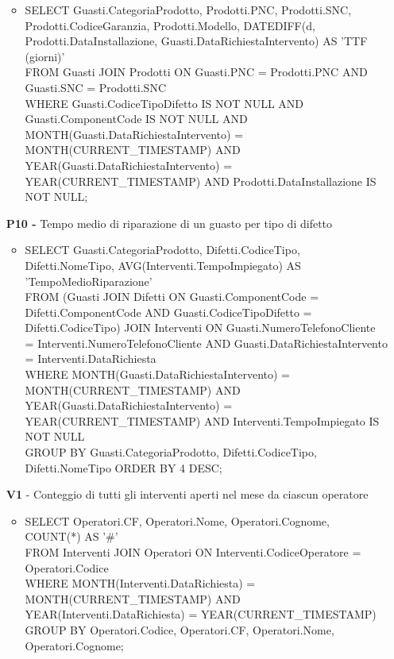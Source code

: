 \documentclass[a4paper, 12pt]{report}
\begin{document}
\begin{itemize}
\begin{itemize}[leftmargin=*, topsep=0pt]
			\item SELECT Guasti.CategoriaProdotto, Prodotti.PNC, Prodotti.SNC, Prodotti.CodiceGaranzia, Prodotti.Modello, DATEDIFF(d, Prodotti.DataInstallazione, Guasti.DataRichiestaIntervento) AS 'TTF (giorni)'\\
			FROM Guasti JOIN Prodotti ON Guasti.PNC = Prodotti.PNC AND Guasti.SNC = Prodotti.SNC\\
			WHERE Guasti.CodiceTipoDifetto IS NOT NULL AND Guasti.ComponentCode IS NOT NULL AND MONTH(Guasti.DataRichiestaIntervento) = \\MONTH(CURRENT\_TIMESTAMP) AND YEAR(Guasti.DataRichiestaIntervento) = YEAR(CURRENT\_TIMESTAMP) AND Prodotti.DataInstallazione IS NOT NULL;
		\end{itemize}
	\newpage
	\item[\textbf{P10 -}] Tempo medio di riparazione di un guasto per tipo di difetto
		\begin{itemize}[leftmargin=*, topsep=0pt]
			\item SELECT Guasti.CategoriaProdotto, Difetti.CodiceTipo, Difetti.NomeTipo, AVG(Interventi.TempoImpiegato) AS 'TempoMedioRiparazione'\\
			FROM (Guasti JOIN Difetti ON Guasti.ComponentCode = Difetti.ComponentCode AND Guasti.CodiceTipoDifetto = Difetti.CodiceTipo) JOIN Interventi ON Guasti.NumeroTelefonoCliente = Interventi.NumeroTelefonoCliente AND Guasti.DataRichiestaIntervento = Interventi.DataRichiesta\\
			WHERE MONTH(Guasti.DataRichiestaIntervento) = MONTH(CURRENT\_TIMESTAMP) AND YEAR(Guasti.DataRichiestaIntervento) = YEAR(CURRENT\_TIMESTAMP) AND Interventi.TempoImpiegato IS NOT NULL\\
			GROUP BY Guasti.CategoriaProdotto, Difetti.CodiceTipo, Difetti.NomeTipo ORDER BY 4 DESC;
		\end{itemize}
	\item[\textbf{V1} -] Conteggio di tutti gli interventi aperti nel mese da ciascun operatore
		\begin{itemize}[leftmargin=*, topsep=0pt]
			\item SELECT Operatori.CF, Operatori.Nome, Operatori.Cognome, COUNT(*) AS '\#'\\
			FROM Interventi JOIN Operatori ON Interventi.CodiceOperatore = Operatori.Codice\\
			WHERE MONTH(Interventi.DataRichiesta) = MONTH(CURRENT\_TIMESTAMP) AND YEAR(Interventi.DataRichiesta) = YEAR(CURRENT\_TIMESTAMP)\\
			GROUP BY Operatori.Codice, Operatori.CF, Operatori.Nome, Operatori.Cognome;

\end{itemize}
\end{itemize}
\end{document}
